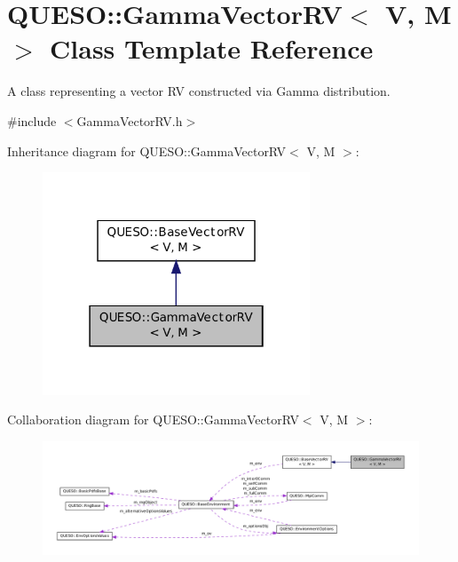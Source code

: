 \hypertarget{class_q_u_e_s_o_1_1_gamma_vector_r_v}{\section{Q\-U\-E\-S\-O\-:\-:Gamma\-Vector\-R\-V$<$ V, M $>$ Class Template Reference}
\label{class_q_u_e_s_o_1_1_gamma_vector_r_v}
}


A class representing a vector R\-V constructed via Gamma distribution.  




{\ttfamily \#include $<$Gamma\-Vector\-R\-V.\-h$>$}



Inheritance diagram for Q\-U\-E\-S\-O\-:\-:Gamma\-Vector\-R\-V$<$ V, M $>$\-:
\nopagebreak
\begin{figure}[H]
\begin{center}
\leavevmode
\includegraphics[width=226pt]{class_q_u_e_s_o_1_1_gamma_vector_r_v__inherit__graph}
\end{center}
\end{figure}


Collaboration diagram for Q\-U\-E\-S\-O\-:\-:Gamma\-Vector\-R\-V$<$ V, M $>$\-:
\nopagebreak
\begin{figure}[H]
\begin{center}
\leavevmode
\includegraphics[width=350pt]{class_q_u_e_s_o_1_1_gamma_vector_r_v__coll__graph}
\end{center}
\end{figure}
